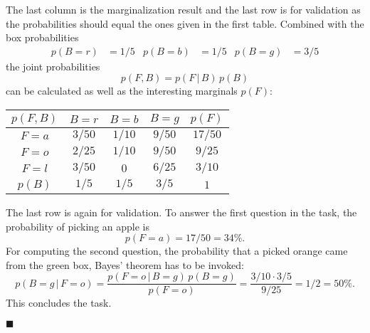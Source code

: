 \documentclass[11pt, a4paper]{scrartcl}
\newcommand{\given}{\,\vert\,}
\newcommand{\eot}{\hfill\(\blacksquare\)}
\begin{document}
			The last column is the marginalization result and the last row is for validation as the probabilities should equal the ones given in the first table. Combined with the box probabilities
			\begin{align}
				p(B = r) &= 1/5 &
				p(B = b) &= 1/5 &
				p(B = g) &= 3/5
			\end{align}
			the joint probabilities
			\begin{equation}
				p(F, B) = p(F \given B) \, p(B)
			\end{equation}
			can be calculated as well as the interesting marginals \( p(F) \):
			\begin{center}
				\begin{tabular}{c|ccc|c}
					\( p(F, B) \) & \(B = r\) & \(B = b\) & \(B = g\) & \( p(F) \) \\ \hline
					  \(F = a\)   & \(3/50\)  & \(1/10\)  & \(9/50\)  & \(17/50\)  \\
					  \(F = o\)   & \(2/25\)  & \(1/10\)  & \(9/50\)  &  \(9/25\)  \\
					  \(F = l\)   & \(3/50\)  &   \(0\)   & \(6/25\)  &  \(3/10\)  \\ \hline
					 \( p(B) \)   &  \(1/5\)  &  \(1/5\)  &  \(3/5\)  &   \(1\)
				\end{tabular}
			\end{center}
			The last row is again for validation. To answer the first question in the task, the probability of picking an apple is
			\begin{equation}
				p(F = a) = 17/50 = 34\%.
			\end{equation}
			For computing the second question, the probability that a picked orange came from the green box, Bayes' theorem has to be invoked:
			\begin{equation}
				p(B = g \given F = o)
					= \frac{p(F = o \given B = g) \, p(B = g)}{p(F = o)}
					= \frac{3/10 \cdot 3/5}{9/25}
					= 1/2
					= 50\%.
			\end{equation}
			This concludes the task.

			\eot
\end{document}
